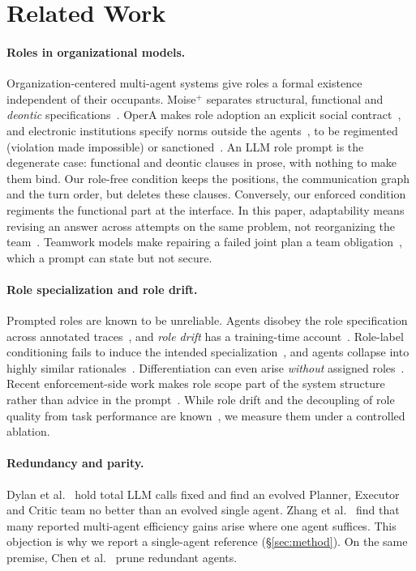 \section{Related Work}
\label{sec:related}

\paragraph{Roles in organizational models.} Organization-centered
multi-agent systems give roles a formal existence independent of their
occupants. Moise$^+$ separates structural, functional and \emph{deontic}
specifications~\cite{hubner2002moise}. OperA makes role adoption an explicit
social contract~\cite{dignum2004opera}, and electronic institutions specify
norms outside the agents~\cite{esteva2001formal}, to be regimented
(violation made impossible) or sanctioned~\cite{grossi2007ubilex}. An LLM
role prompt is the degenerate case: functional and deontic clauses in prose,
with nothing to make them bind. Our role-free condition keeps the positions,
the communication graph and the turn order, but deletes these clauses.
Conversely, our enforced condition regiments the functional part at the
interface. In this paper, adaptability means revising an answer across
attempts on the same problem, not reorganizing the
team~\cite{horling2004survey}. Teamwork models make repairing a failed joint
plan a team obligation~\cite{tambe1997flexible}, which a prompt can state
but not secure.

\paragraph{Role specialization and role drift.} Prompted roles are known to
be unreliable. Agents disobey the role specification across annotated
traces~\cite{cemri2025why}, and \emph{role drift} has a training-time
account~\cite{cao2026modules}. Role-label conditioning fails to induce the
intended specialization~\cite{orogat2026architectural}, and agents collapse
into highly similar rationales~\cite{patel2026representational}.
Differentiation can even arise \emph{without} assigned
roles~\cite{kandoussi2026whoami}. Recent enforcement-side work makes role
scope part of the system structure rather than advice in the
prompt~\cite{stettler2026progressive,ge2026roles}. While role drift and the
decoupling of role quality from task performance are
known~\cite{cao2026modules,yang2026precise}, we measure them under a
controlled ablation.

\paragraph{Redundancy and parity.} Dylan et al.~\cite{dylan2026equal} hold
total LLM calls fixed and find an evolved Planner, Executor and Critic team
no better than an evolved single agent. Zhang et
al.~\cite{zhang2026rethinking} find that many reported multi-agent
efficiency gains arise where one agent suffices. This objection is why we
report a single-agent reference (\S\ref{sec:method}). On the same premise,
Chen et al.~\cite{chen2026agentslimming} prune redundant agents.


